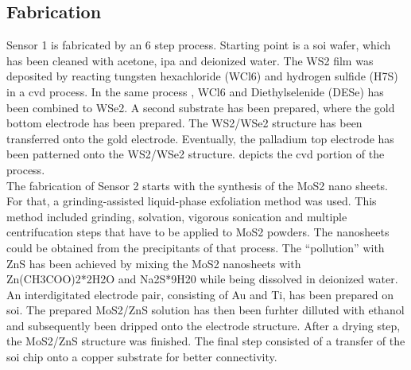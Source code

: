 \subsection{Fabrication}
Sensor 1 is fabricated by an 6 step process. Starting point is a \Gls{soi} wafer, which has been cleaned with acetone, \gls{ipa} and deionized water.  The WS2 film was deposited by reacting tungsten hexachloride (WCl6) and hydrogen sulfide (H7S) in a \gls{cvd} process. In the same process , WCl6 and Diethylselenide (DESe) has been combined to WSe2. A second substrate has been prepared, where the gold bottom electrode has been prepared. The WS2/WSe2 structure has been transferred onto the gold electrode. Eventually, the palladium top electrode has been patterned onto the WS2/WSe2 structure.  depicts the \gls{cvd} portion of the process.\\
The fabrication of Sensor 2 starts with the synthesis of the MoS2 nano sheets. For that, a grinding-assisted liquid-phase exfoliation method was used. This method included grinding, solvation, vigorous sonication and multiple centrifucation steps that have to be applied to MoS2 powders. The nanosheets could be obtained from the precipitants of that process. The \enquote{pollution} with ZnS has been achieved by mixing the MoS2 nanosheets with Zn(CH3COO)2*2H2O and Na2S*9H20 while being dissolved in deionized water. An interdigitated electrode pair, consisting of Au and Ti, has been prepared on \gls{soi}. The prepared MoS2/ZnS solution has then been furhter dilluted with ethanol and subsequently been dripped onto the electrode structure. After a drying step, the MoS2/ZnS structure was finished. The final step consisted of a transfer of the \gls{soi} chip onto a copper substrate for better connectivity.
